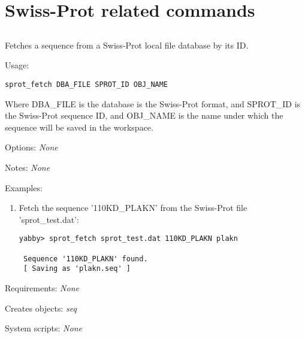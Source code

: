 

\section{Swiss-Prot related commands}


\subsection[sprot\_fetch]{  }



Fetches a sequence from a Swiss-Prot local file database
by its ID.


\begin{description}


\item{Usage:}

{\tt sprot\_fetch DBA\_FILE SPROT\_ID OBJ\_NAME}

Where DBA\_FILE is the database is the Swiss-Prot format,
and SPROT\_ID is the Swiss-Prot sequence ID, and OBJ\_NAME
is the name under which the sequence will be saved in the
workspace.


\item{Options:}
{\em None}


\item{Notes:}
{\em None}


\item{Examples:}
\begin{enumerate}

\item Fetch the sequence '110KD\_PLAKN' from the Swiss-Prot
file 'sprot\_test.dat':
\begin{verbatim}
yabby> sprot_fetch sprot_test.dat 110KD_PLAKN plakn

 Sequence '110KD_PLAKN' found.
 [ Saving as 'plakn.seq' ]
\end{verbatim}

\end{enumerate}


\item{Requirements:} {\em None}


\item{Creates objects:} {\em seq}


\item{System scripts:} {\em None}

\end{description}

